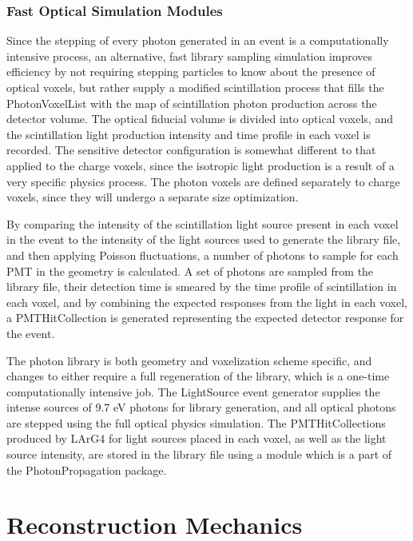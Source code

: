 \documentclass[12pt]{elsarticle}
\begin{document}
\subsubsection{Fast Optical Simulation Modules}

Since the stepping of every photon generated in an event is a computationally intensive process, an alternative, fast library sampling simulation improves efficiency by not requiring stepping particles to know about the presence of optical voxels, but rather supply a modified scintillation process that fills the PhotonVoxelList with the map of scintillation photon production across the detector volume. 
The optical fiducial volume is divided into optical voxels, and the scintillation light production intensity and time profile in each voxel is recorded.  The sensitive detector configuration is somewhat different to that applied to the charge voxels, since the isotropic light production is a result of a very specific physics process.  The photon voxels are defined separately to charge voxels, since they will undergo a separate size optimization.

By comparing the intensity of the scintillation light source present in each voxel in the event to the intensity of the light sources used to generate the library file, and then applying Poisson fluctuations, a number of photons to sample for each PMT in the geometry is calculated.  A set of photons are sampled from the library file, their detection time is smeared by the time profile of scintillation in each voxel, and by combining the expected responses from the light in each voxel, a PMTHitCollection is generated representing the expected detector response for the event.

The photon library is both geometry and voxelization scheme specific, and changes to either require a full regeneration of the library, which is a one-time computationally intensive job.  The LightSource event generator supplies the intense sources of 9.7 eV photons for library generation, and all optical photons are stepped using the full optical physics simulation. The PMTHitCollections produced by LArG4 for light sources placed in each voxel, as well as the light source intensity, are stored in the library file using a module which is a part of the PhotonPropagation package.  

\section{Reconstruction Mechanics}
\end{document}
